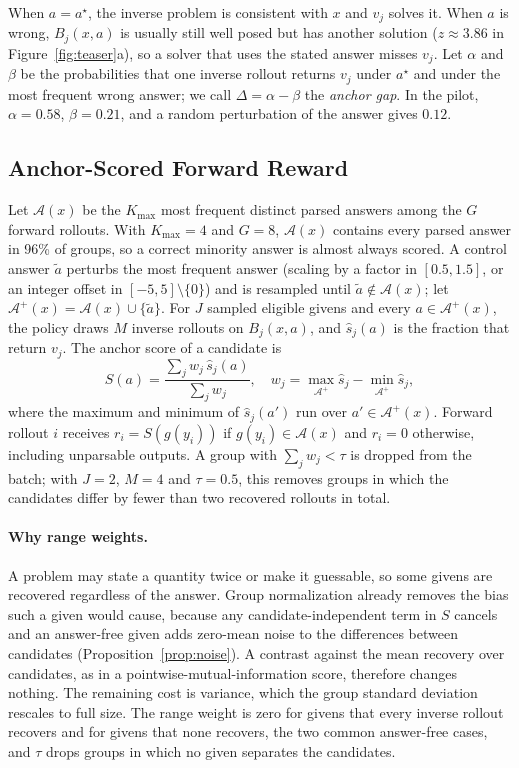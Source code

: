 \documentclass[11pt]{article}
\theoremstyle{remark}
\newcommand{\cA}{\mathcal{A}}
\newcommand{\Aplus}{\mathcal{A}^{+}}
\newcommand{\shat}{\hat{s}}
\newcommand{\astar}{a^{\star}}
\newcommand{\atilde}{\tilde{a}}
\newcommand{\Kmax}{K_{\max}}
\begin{document}
When $a=\astar$, the inverse problem is consistent with $x$ and $v_j$ solves it. When $a$ is wrong, $B_j(x,a)$ is usually still well posed but has another solution ($z\approx3.86$ in Figure~\ref{fig:teaser}a), so a solver that uses the stated answer misses $v_j$. Let $\alpha$ and $\beta$ be the probabilities that one inverse rollout returns $v_j$ under $\astar$ and under the most frequent wrong answer; we call $\Delta=\alpha-\beta$ the \emph{anchor gap}. In the pilot, $\alpha=0.58$, $\beta=0.21$, and a random perturbation of the answer gives $0.12$.

\subsection{Anchor-Scored Forward Reward}
\label{sec:reward}

Let $\cA(x)$ be the $\Kmax$ most frequent distinct parsed answers among the $G$ forward rollouts. With $\Kmax=4$ and $G=8$, $\cA(x)$ contains every parsed answer in 96\% of groups, so a correct minority answer is almost always scored. A control answer $\atilde$ perturbs the most frequent answer (scaling by a factor in $[0.5,1.5]$, or an integer offset in $[-5,5]\setminus\{0\}$) and is resampled until $\atilde\notin\cA(x)$; let $\Aplus(x)=\cA(x)\cup\{\atilde\}$. For $J$ sampled eligible givens and every $a\in\Aplus(x)$, the policy draws $M$ inverse rollouts on $B_j(x,a)$, and $\shat_j(a)$ is the fraction that return $v_j$. The anchor score of a candidate is
\begin{equation}
\label{eq:score}
S(a)=\frac{\sum_j w_j\,\shat_j(a)}{\sum_j w_j},\quad w_j=\max_{\Aplus}\shat_j-\min_{\Aplus}\shat_j ,
\end{equation}
where the maximum and minimum of $\shat_j(a')$ run over $a'\in\Aplus(x)$.
Forward rollout $i$ receives $r_i=S(g(y_i))$ if $g(y_i)\in\cA(x)$ and $r_i=0$ otherwise, including unparsable outputs. A group with $\sum_j w_j<\tau$ is dropped from the batch; with $J=2$, $M=4$ and $\tau=0.5$, this removes groups in which the candidates differ by fewer than two recovered rollouts in total.

\paragraph{Why range weights.}
A problem may state a quantity twice or make it guessable, so some givens are recovered regardless of the answer. Group normalization already removes the bias such a given would cause, because any candidate-independent term in $S$ cancels and an answer-free given adds zero-mean noise to the differences between candidates (Proposition~\ref{prop:noise}). A contrast against the mean recovery over candidates, as in a pointwise-mutual-information score, therefore changes nothing. The remaining cost is variance, which the group standard deviation rescales to full size. The range weight is zero for givens that every inverse rollout recovers and for givens that none recovers, the two common answer-free cases, and $\tau$ drops groups in which no given separates the candidates.
\end{document}
